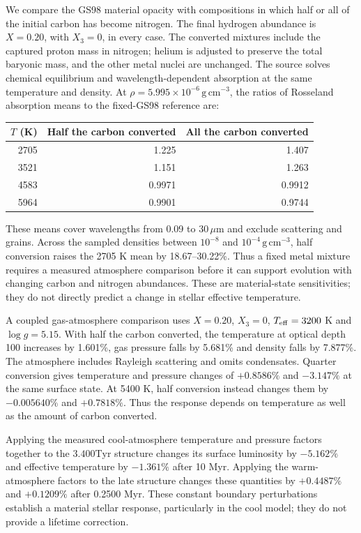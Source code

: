 \documentclass[11pt,letterpaper]{article}
\newcommand{\Tyr}{\mathrm{Tyr}}
\begin{document}
We compare the GS98 material opacity with compositions in which half or
all of the initial carbon has become nitrogen. The final hydrogen abundance
is $X=0.20$, with $X_3=0$, in every case. The converted mixtures include the
captured proton mass in nitrogen; helium is adjusted to preserve the total
baryonic mass, and the other metal nuclei are unchanged. The source solves
chemical equilibrium and wavelength-dependent absorption at the same
temperature and density. At
$\rho=5.995\times10^{-6}\,\mathrm{g\,cm^{-3}}$, the ratios of Rosseland
absorption means to the fixed-GS98 reference are:

\begin{center}
\begin{tabular}{@{}rrr@{}}\toprule
$T$ (K) & Half the carbon converted & All the carbon converted \\\midrule
2705 & 1.225 & 1.407 \\
3521 & 1.151 & 1.263 \\
4583 & 0.9971 & 0.9912 \\
5964 & 0.9901 & 0.9744 \\\bottomrule
\end{tabular}
\end{center}

These means cover wavelengths from 0.09 to $30\,\mu\mathrm{m}$ and exclude
scattering and grains. Across the sampled densities between $10^{-8}$ and
$10^{-4}\,\mathrm{g\,cm^{-3}}$, half conversion raises the 2705 K mean by
18.67--30.22\%. Thus a fixed metal mixture requires a measured atmosphere
comparison before it can support evolution with changing carbon and nitrogen abundances.
These are material-state sensitivities; they do not directly predict a
change in stellar effective temperature.

A coupled gas-atmosphere comparison uses $X=0.20$, $X_3=0$,
$T_{\rm eff}=3200$ K and $\log g=5.15$. With half the carbon converted,
the temperature at optical depth 100 increases by 1.601\%, gas pressure
falls by 5.681\% and density falls by 7.877\%. The atmosphere includes
Rayleigh scattering and omits condensates. Quarter conversion gives
temperature and pressure changes of $+0.8586\%$ and $-3.147\%$ at the
same surface state. At 5400 K, half conversion instead changes them by
$-0.005640\%$ and $+0.7818\%$. Thus the response depends on temperature
as well as the amount of carbon converted.

Applying the measured cool-atmosphere temperature and pressure factors
together to the $3.400\Tyr$ structure changes its surface luminosity by
$-5.162\%$ and effective temperature by $-1.361\%$ after 10 Myr.
Applying the warm-atmosphere factors to the late structure changes these
quantities by $+0.4487\%$ and $+0.1209\%$ after 0.2500 Myr. These
constant boundary perturbations establish a material stellar response,
particularly in the cool model; they do not provide a lifetime correction.
\end{document}
